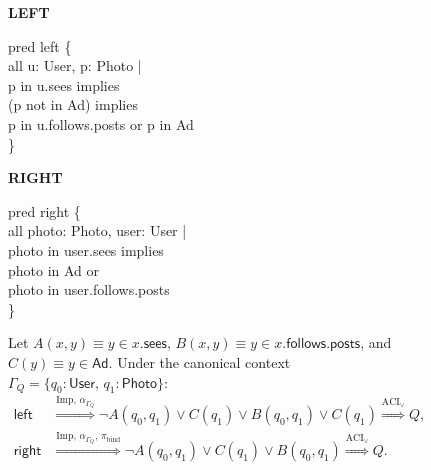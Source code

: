 \begin{figure}[t]
\centering
\scriptsize
\setlength{\fboxsep}{4pt}


\vspace{4pt}

\begin{minipage}[t]{0.47\linewidth}
\raggedright
\textbf{LEFT}\par
\ttfamily
pred left \{\\
\hspace*{1em}all u: User, p: Photo |\\
\hspace*{2em}p in u.sees implies\\
\hspace*{3em}(p not in Ad) implies\\
\hspace*{4em}p in u.follows.posts or p in Ad\\
\}
\end{minipage}
\hfill
\begin{minipage}[t]{0.47\linewidth}
\raggedright
\textbf{RIGHT}\par
\ttfamily
pred right \{\\
\hspace*{1em}all photo: Photo, user: User |\\
\hspace*{2em}photo in user.sees implies\\
\hspace*{3em}photo in Ad or\\
\hspace*{3em}photo in user.follows.posts\\
\}
\end{minipage}

\vspace{4pt}

\begin{minipage}{0.95\linewidth}
Let
\(A(x,y)\equiv y\in x.\mathsf{sees}\),
\(B(x,y)\equiv y\in x.\mathsf{follows}.\mathsf{posts}\), and
\(C(y)\equiv y\in\mathsf{Ad}\).
Under the canonical context
\(\Gamma_Q=\{q_0:\mathsf{User},\,q_1:\mathsf{Photo}\}\):
\[
\begin{aligned}
\mathsf{left}
&\stackrel{\mathrm{Imp},\,\alpha_{\Gamma_Q}}{\Longrightarrow}
  \neg A(q_0,q_1)\lor C(q_1)\lor B(q_0,q_1)\lor C(q_1)
\stackrel{\mathrm{ACI}_{\lor}}{\Longrightarrow} Q,
\\
\mathsf{right}
&\stackrel{\mathrm{Imp},\,\alpha_{\Gamma_Q},\,\pi_{\mathrm{bind}}}{\Longrightarrow}
  \neg A(q_0,q_1)\lor C(q_1)\lor B(q_0,q_1)
\stackrel{\mathrm{ACI}_{\lor}}{\Longrightarrow} Q.
\end{aligned}
\]
\end{minipage}


\end{figure}
